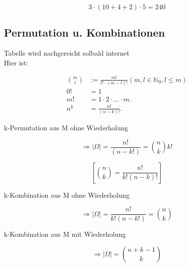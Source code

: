 \[3\cdot (10+4+2)\cdot 5=240\]

\subsection{Permutation u. Kombinationen}

Tabelle wird nachgereicht solbald internet\\

Hier ist:

\begin{align}
    \binom{m}{l}&:=\frac{m!}{l!\cdot (m-l)!} (m,l\in\mathbb{N}_0,l\leq m)\\
    0!&=1\\
    m!&=1\cdot 2\cdot ...\cdot m.\\
    n^{\underline{k}}&=\frac{n!}{(n-k)!}.  
\end{align}

k-Permutation aus M ohne Wiederholung

\[\Longrightarrow \left\lvert \Omega \right\rvert = \frac{n!}{(n-k!)}=\binom{n}{k}k!\]

\[\left[ \binom{n}{k}=\frac{n!}{k!(n-k)!}\right]\]

k-Kombination aus M ohne Wiederholung

\[\Longrightarrow \left\lvert \Omega \right\rvert = \frac{n!}{k!(n-k!)}=\binom{n}{k}\]

k-Kombination aus M mit Wiederholung

\[\Longrightarrow \left\lvert \Omega \right\rvert = \binom{n+k-1}{k}\]



